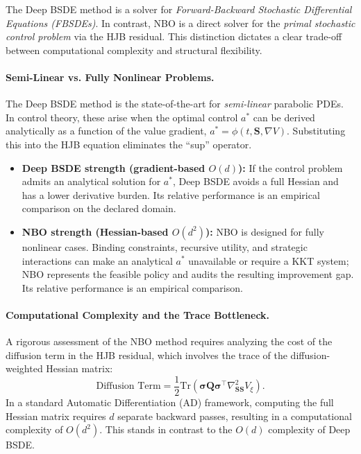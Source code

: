 \documentclass[ecta]{econsocart}
\theoremstyle{plain}
\theoremstyle{remark}
\newcommand{\statevec}{\bm{S}}
\newcommand{\diffvec}{\bm{\sigma}}
\begin{document}
The Deep BSDE method is a solver for \textit{Forward-Backward Stochastic Differential Equations (FBSDEs)}. In contrast, NBO is a direct solver for the \textit{primal stochastic control problem} via the HJB residual. This distinction dictates a clear trade-off between computational complexity and structural flexibility.

\paragraph*{Semi-Linear vs. Fully Nonlinear Problems.}
The Deep BSDE method is the state-of-the-art for \textit{semi-linear} parabolic PDEs. In control theory, these arise when the optimal control $a^*$ can be derived analytically as a function of the value gradient, $a^* = \phi(t, \statevec, \nabla V)$. Substituting this into the HJB equation eliminates the ``sup'' operator.
\begin{itemize}
    \item \textbf{Deep BSDE strength (gradient-based $O(d)$):} If the control problem admits an analytical solution for $a^*$, Deep BSDE avoids a full Hessian and has a lower derivative burden. Its relative performance is an empirical comparison on the declared domain.
    \item \textbf{NBO strength (Hessian-based $O(d^2)$):} NBO is designed for fully nonlinear cases. Binding constraints, recursive utility, and strategic interactions can make an analytical $a^*$ unavailable or require a KKT system; NBO represents the feasible policy and audits the resulting improvement gap. Its relative performance is an empirical comparison.
\end{itemize}

\paragraph*{Computational Complexity and the Trace Bottleneck.}
A rigorous assessment of the NBO method requires analyzing the cost of the diffusion term in the HJB residual, which involves the trace of the diffusion-weighted Hessian matrix:
\begin{equation}
\text{Diffusion Term} = \frac{1}{2}\text{Tr}\left(\diffvec \bm{Q} \diffvec^\top \nabla_{\statevec\statevec}^2 V_\xi\right).
\end{equation}
In a standard Automatic Differentiation (AD) framework, computing the full Hessian matrix requires $d$ separate backward passes, resulting in a computational complexity of $O(d^2)$. This stands in contrast to the $O(d)$ complexity of Deep BSDE.
\end{document}
